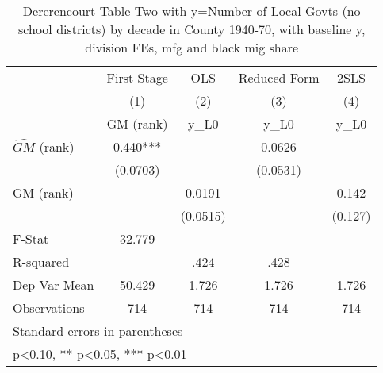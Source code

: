 \begin{table}[htbp]\centering
\def\sym#1{\ifmmode^{#1}\else\(^{#1}\)\fi}
\caption{Dererencourt Table Two with y=Number of Local Govts (no school districts) by decade in County 1940-70, with baseline y, division FEs, mfg and black mig share}
\begin{tabular}{l*{4}{c}}
\toprule
                    & First Stage   &         OLS   &Reduced Form   &        2SLS   \\
                    &\multicolumn{1}{c}{(1)}&\multicolumn{1}{c}{(2)}&\multicolumn{1}{c}{(3)}&\multicolumn{1}{c}{(4)}\\
                    &\multicolumn{1}{c}{GM  (rank)}&\multicolumn{1}{c}{y\_L0}&\multicolumn{1}{c}{y\_L0}&\multicolumn{1}{c}{y\_L0}\\
\midrule
$\hat{GM}$ (rank)   &       0.440***&               &      0.0626   &               \\
                    &    (0.0703)   &               &    (0.0531)   &               \\
\addlinespace
GM  (rank)          &               &      0.0191   &               &       0.142   \\
                    &               &    (0.0515)   &               &     (0.127)   \\
\midrule
F-Stat              &      32.779   &               &               &               \\
R-squared           &               &        .424   &        .428   &               \\
Dep Var Mean        &      50.429   &       1.726   &       1.726   &       1.726   \\
Observations        &         714   &         714   &         714   &         714   \\
\bottomrule
\multicolumn{5}{l}{\footnotesize Standard errors in parentheses}\\
\multicolumn{5}{l}{\footnotesize * p<0.10, ** p<0.05, *** p<0.01}\\
\end{tabular}
\end{table}
